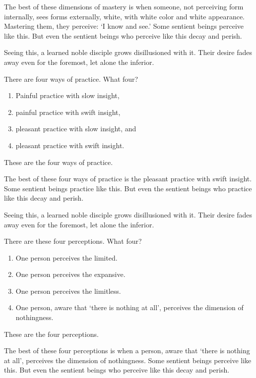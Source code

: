 \documentclass[12pt,openany]{book}%
\begin{document}
The best of these dimensions of mastery is when someone, not perceiving form internally, sees forms externally, white, with white color and white appearance. Mastering them, they perceive: ‘I know and see.’ Some sentient beings perceive like this. But even the sentient beings who perceive like this decay and perish. 

Seeing this, a learned noble disciple grows disillusioned with it. Their desire fades away even for the foremost, let alone the inferior. 

There are four ways of practice. What four? 

\begin{enumerate}%
\item Painful practice with slow insight, %
\item painful practice with swift insight, %
\item pleasant practice with slow insight, and %
\item pleasant practice with swift insight. %
\end{enumerate}

These are the four ways of practice. 

The best of these four ways of practice is the pleasant practice with swift insight. Some sentient beings practice like this. But even the sentient beings who practice like this decay and perish. 

Seeing this, a learned noble disciple grows disillusioned with it. Their desire fades away even for the foremost, let alone the inferior. 

There are these four perceptions. What four? 

\begin{enumerate}%
\item One person perceives the limited. %
\item One person perceives the expansive. %
\item One person perceives the limitless. %
\item One person, aware that ‘there is nothing at all’, perceives the dimension of nothingness. %
\end{enumerate}

These are the four perceptions. 

The best of these four perceptions is when a person, aware that ‘there is nothing at all’, perceives the dimension of nothingness. Some sentient beings perceive like this. But even the sentient beings who perceive like this decay and perish. 
\end{document}
